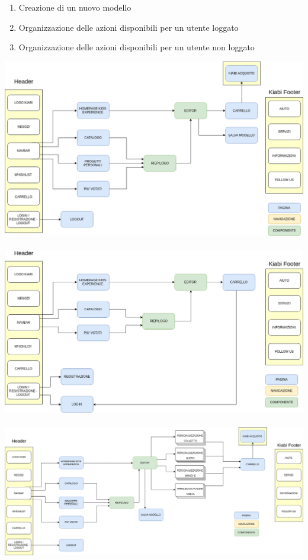 \documentclass[12pt,italian,]{report}
\providecommand{\tightlist}{%
  \setlength{\itemsep}{0pt}\setlength{\parskip}{0pt}}
\begin{document}
\begin{enumerate}
\def\labelenumi{\arabic{enumi}.}
\tightlist
\item
  Creazione di un nuovo modello
\item
  Organizzazione delle azioni disponibili per un utente loggato
\item
  Organizzazione delle azioni disponibili per un utente non loggato
\end{enumerate}
\includegraphics{blueprints/Utente_loggato.png}
\\
\\
\includegraphics{blueprints/Utente_non_loggato.png}
\\
\\
\includegraphics{blueprints/Creazione_modello.png}
\newpage
\end{document}
